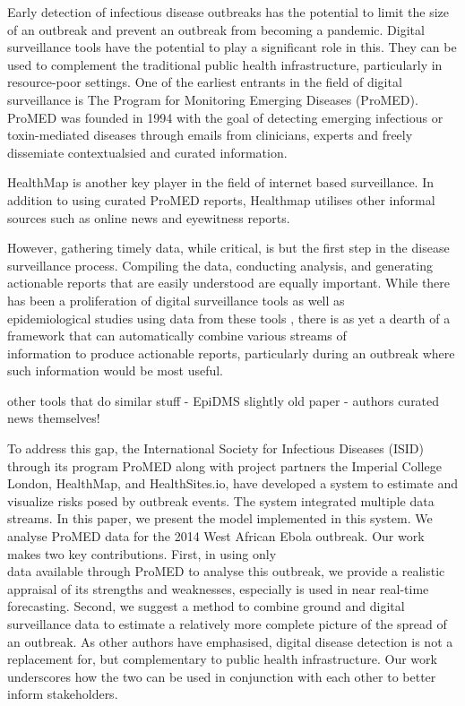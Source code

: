 \documentclass[]{article}
\begin{document}
Early detection of infectious disease outbreaks has the potential to
limit the size of an outbreak and prevent an outbreak from becoming a
pandemic. Digital surveillance tools have the potential to play a
significant role in this. They can be used to complement the traditional
public health infrastructure, particularly in resource-poor settings.
One of the earliest entrants in the field of digital surveillance is The
Program for Monitoring Emerging Diseases (ProMED). ProMED was founded in
1994 with the goal of detecting emerging infectious or toxin-mediated
diseases through emails from clinicians, experts and freely dissemiate
contextualsied and curated information.

HealthMap is another key player in the field of internet based
surveillance. In addition to using curated ProMED reports, Healthmap
utilises other informal sources such as online news and eyewitness
reports.

However, gathering timely data, while critical, is but the first step in
the disease surveillance process. Compiling the data, conducting
analysis, and generating actionable reports that are easily understood
are equally important. While there has been a proliferation of digital
surveillance tools as well as\\
epidemiological studies using data from these tools
\citep{chowell2016elucidating}, there is as yet a dearth of a framework
that can automatically combine various streams of\\
information to produce actionable reports, particularly during an
outbreak where such information would be most useful.

other tools that do similar stuff - EpiDMS \citep{liu2016epidms}
slightly old paper - authors curated news themselves!
\citep{chowell2016elucidating}

To address this gap, the International Society for Infectious Diseases
(ISID) through its program ProMED along with project partners the
Imperial College London, HealthMap, and HealthSites.io, have developed a
system to estimate and visualize risks posed by outbreak events. The
system integrated multiple data streams. In this paper, we present the
model implemented in this system. We analyse ProMED data for the 2014
West African Ebola outbreak. Our work makes two key contributions.
First, in using only\\
data available through ProMED to analyse this outbreak, we provide a
realistic appraisal of its strengths and weaknesses, especially is used
in near real-time forecasting. Second, we suggest a method to combine
ground and digital surveillance data to estimate a relatively more
complete picture of the spread of an outbreak. As other authors have
emphasised, digital disease detection is not a replacement for, but
complementary to public health infrastructure. Our work underscores how
the two can be used in conjunction with each other to better inform
stakeholders.
\end{document}
